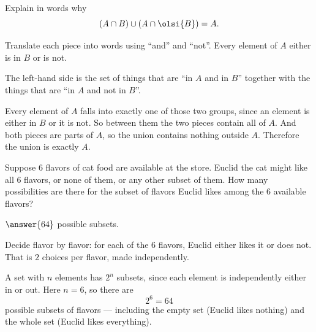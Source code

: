 \documentclass[12pt]{ximera}
\begin{document}
\begin{problem}
Explain in words why
\[ \left(A\cap B\right)\cup\left(A\cap\olsi{B}\right) = A. \]

\begin{freeResponse}
\end{freeResponse}

\begin{hint}
Translate each piece into words using ``and'' and ``not''. Every element of $A$ either
is in $B$ or is not.
\end{hint}

\begin{feedback}
The left-hand side is the set of things that are ``in $A$ and in $B$'' together with
the things that are ``in $A$ and not in $B$''.

Every element of $A$ falls into exactly one of those two groups, since an element is
either in $B$ or it is not. So between them the two pieces contain all of $A$. And both
pieces are parts of $A$, so the union contains nothing outside $A$. Therefore the union
is exactly $A$.
\end{feedback}
\end{problem}

\begin{problem}
Suppose $6$ flavors of cat food are available at the store. Euclid the cat might like all $6$ flavors, or none of them, or any other
subset of them. How many possibilities are there for the subset of flavors Euclid
likes among the $6$ available flavors?

$\answer{64}$ possible subsets.

\begin{hint}
Decide flavor by flavor: for each of the $6$ flavors, Euclid either likes it or does
not. That is $2$ choices per flavor, made independently.
\end{hint}

\begin{feedback}
A set with $n$ elements has $2^n$ subsets, since each element is independently either
in or out. Here $n=6$, so there are
\[ 2^6 = 64 \]
possible subsets of flavors --- including the empty set (Euclid likes nothing) and
the whole set (Euclid likes everything).
\end{feedback}
\end{problem}
\end{document}
